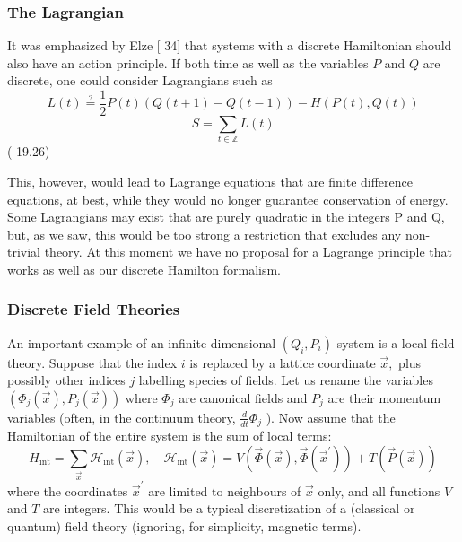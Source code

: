 \documentclass[main.tex]{subfiles}
\begin{document}
\subsubsection{The Lagrangian}\label{ch19.4.3}

It was emphasized by Elze [ 34] that systems with a discrete Hamiltonian should also have an action principle. If both time as well as the variables $P$ and $Q$ are discrete, one could consider Lagrangians such as
$$
L(t) \stackrel{?}{=} \frac{1}{2} P(t)(Q(t+1)-Q(t-1))-H(P(t), Q(t))
$$
$$
S=\sum_{t \in \mathbb{Z}} L(t)
$$
( 19.26)

This, however, would lead to Lagrange equations that are finite difference equations,
at best, while they would no longer guarantee conservation of energy. Some
Lagrangians may exist that are purely quadratic in the integers P and Q, but, as we
saw, this would be too strong a restriction that excludes any non-trivial theory. At
this moment we have no proposal for a Lagrange principle that works as well as our
discrete Hamilton formalism.


\subsubsection{Discrete Field Theories}\label{ch19.4.4}

An important example of an infinite-dimensional $\left(Q_{i}, P_{i}\right)$ system is a local field theory. Suppose that the index $i$ is replaced by a lattice coordinate $\vec{x},$ plus possibly other indices $j$ labelling species of fields. Let us rename the variables $\left(\Phi_{j}(\vec{x}), P_{j}(\vec{x})\right)$ where $\Phi_{j}$ are canonical fields and $P_{j}$ are their momentum variables (often, in the continuum theory, $\frac{d}{d t} \Phi_{j}$ ). Now assume that the Hamiltonian of the entire system is the sum of local terms:
$$
H_{\mathrm{int}}=\sum_{\vec{x}} \mathcal{H}_{\mathrm{int}}(\vec{x}), \quad \mathcal{H}_{\mathrm{int}}(\vec{x})=V\left(\vec{\Phi}(\vec{x}), \vec{\Phi}\left(\vec{x}^{\prime}\right)\right)+T(\vec{P}(\vec{x}))
$$
where the coordinates $\vec{x}^{\prime}$ are limited to neighbours of $\vec{x}$ only, and all functions $V$ and $T$ are integers. This would be a typical discretization of a (classical or quantum) field theory (ignoring, for simplicity, magnetic terms).
\end{document}
